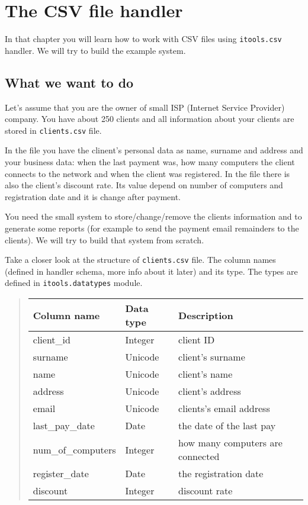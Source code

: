 \documentclass[a4paper]{book}
\begin{document}
\chapter{The CSV file handler}

In that chapter you will learn how to work with CSV files using
{\tt itools.csv} handler. We will try to build the example system.


\section{What we want to do}

Let's assume that you are the owner of small ISP (Internet Service
Provider) company. You have about 250 clients and all information
about your clients are stored in {\tt clients.csv} file.

In the file you have the clinent's personal data as name, surname
and address and your business data: when the last payment was, how many
computers the client connects to the network and when the client was
registered. In the file there is also the client's discount rate. 
Its value depend on number of computers and registration date
and it is change after payment.

You need the small system to store/change/remove the clients information
and to generate some reports (for example to send the payment email 
remainders to the clients). We will try to build that system from 
scratch.

Take a closer look at the structure of {\tt clients.csv} file. 
The column names (defined in handler schema, more info about it later) 
and its type. The types are defined in {\tt itools.datatypes} module.

\begin{quote}
\begin{tabular}{|l|l|l|}
    \hline
    Column name & Data type & Description \\
    \hline
    client\_id & Integer & client ID \\
    surname & Unicode & client's surname \\
    name & Unicode & client's name \\
    address & Unicode & client's address \\
    email & Unicode & clients's email address \\
    last\_pay\_date & Date & the date of the last pay \\
    num\_of\_computers & Integer & how many computers are connected \\
    register\_date & Date & the registration date \\
    discount & Integer & discount rate \\
    \hline
\end{tabular}
\end{quote}
\end{document}

